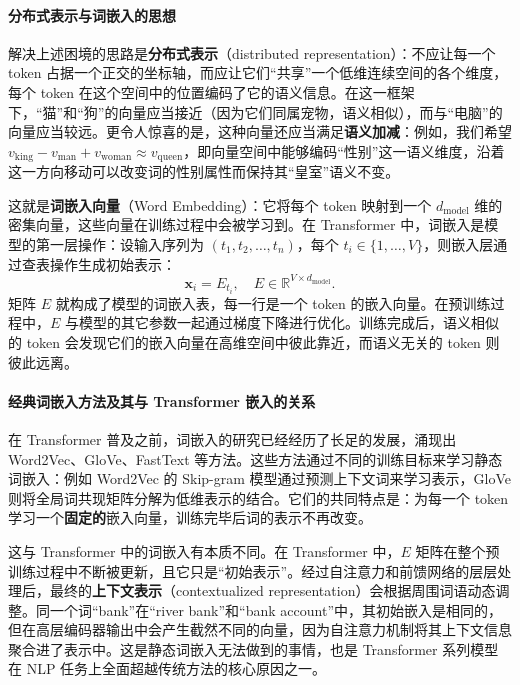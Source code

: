 \paragraph{分布式表示与词嵌入的思想} 解决上述困境的思路是\textbf{分布式表示}（distributed representation）：不应让每一个 token 占据一个正交的坐标轴，而应让它们“共享”一个低维连续空间的各个维度，每个 token 在这个空间中的位置编码了它的语义信息。在这一框架下，“猫”和“狗”的向量应当接近（因为它们同属宠物，语义相似），而与“电脑”的向量应当较远。更令人惊喜的是，这种向量还应当满足\textbf{语义加减}：例如，我们希望 $v_{\text{king}} - v_{\text{man}} + v_{\text{woman}} \approx v_{\text{queen}}$，即向量空间中能够编码“性别”这一语义维度，沿着这一方向移动可以改变词的性别属性而保持其“皇室”语义不变\cite{mikolov2013efficientestimationwordrepresentations,mikolov2013distributedrepresentationswordsphrases}。

这就是\textbf{词嵌入向量}（Word Embedding）：它将每个 token 映射到一个 $d_{\text{model}}$ 维的密集向量，这些向量在训练过程中会被学习到。在 Transformer 中，词嵌入是模型的第一层操作：设输入序列为 $(t_1, t_2, \dots, t_n)$，每个 $t_i \in \{1, \dots, V\}$，则嵌入层通过查表操作生成初始表示：
\[
\mathbf{x}_i = E_{t_i}, \quad E \in \mathbb{R}^{V \times d_{\text{model}}}.
\]
矩阵 $E$ 就构成了模型的词嵌入表，每一行是一个 token 的嵌入向量。在预训练过程中，$E$ 与模型的其它参数一起通过梯度下降进行优化。训练完成后，语义相似的 token 会发现它们的嵌入向量在高维空间中彼此靠近，而语义无关的 token 则彼此远离。

\paragraph{经典词嵌入方法及其与 Transformer 嵌入的关系} 在 Transformer 普及之前，词嵌入的研究已经经历了长足的发展，涌现出 Word2Vec\cite{mikolov2013efficientestimationwordrepresentations,mikolov2013distributedrepresentationswordsphrases}、GloVe\cite{2014Glove}、FastText\cite{bojanowski2017enrichingwordvectorssubword} 等方法。这些方法通过不同的训练目标来学习静态词嵌入：例如 Word2Vec 的 Skip-gram 模型通过预测上下文词来学习表示，GloVe 则将全局词共现矩阵分解为低维表示的结合。它们的共同特点是：为每一个 token 学习一个\textbf{固定的}嵌入向量，训练完毕后词的表示不再改变。

这与 Transformer 中的词嵌入有本质不同。在 Transformer 中，$E$ 矩阵在整个预训练过程中不断被更新，且它只是“初始表示”。经过自注意力和前馈网络的层层处理后，最终的\textbf{上下文表示}（contextualized representation）会根据周围词语动态调整。同一个词“bank”在“river bank”和“bank account”中，其初始嵌入是相同的，但在高层编码器输出中会产生截然不同的向量，因为自注意力机制将其上下文信息聚合进了表示中。这是静态词嵌入无法做到的事情，也是 Transformer 系列模型在 NLP 任务上全面超越传统方法的核心原因之一\cite{peters2018deepcontextualizedwordrepresentations,devlin2019bertpretrainingdeepbidirectional}。

